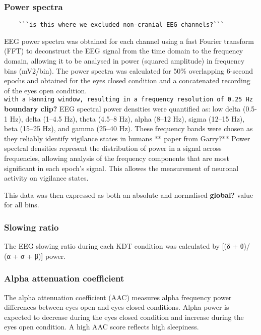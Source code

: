 \documentclass[
]{article}
\begin{document}
\subsubsection{Power spectra}\label{power-spectra}

\begin{verbatim}
    ```is this where we excluded non-cranial EEG channels?```
\end{verbatim}

EEG power spectra was obtained for each channel using a fast Fourier
transform (FFT) to deconstruct the EEG signal from the time domain to
the frequency domain, allowing it to be analysed in power (squared
amplitude) in frequency bins (mV2/bin). The power spectra was calculated
for 50\% overlapping 6-second epochs and obtained for the eyes closed
condition and a concatenated recording of the eyes open condition.
\texttt{with\ a\ Hanning\ window,\ resulting\ in\ a\ frequency\ resolution\ of\ 0.25\ Hz}
\textbf{boundary clip?} EEG spectral power densities were quantified as:
low delta (0.5-1 Hz), delta (1--4.5 Hz), theta (4.5--8 Hz), alpha (8--12
Hz), sigma (12--15 Hz), beta (15--25 Hz), and gamma (25--40 Hz). These
frequency bands were chosen as they reliably identify vigilance states
in humans ** paper from Garry?** Power spectral densities represent the
distribution of power in a signal across frequencies, allowing analysis
of the frequency components that are most significant in each epoch's
signal. This allowes the measurement of neuronal activity on vigilance
states.

This data was then expressed as both an absolute and normalised
\textbf{global?} value for all bins.

\subsubsection{Slowing ratio}\label{slowing-ratio}

The EEG slowing ratio during each KDT condition was calculated by {[}(δ
+ θ)/ (α + σ + β){]} power.

\subsubsection{Alpha attenuation
coefficient}\label{alpha-attenuation-coefficient}

The alpha attenuation coefficient (AAC) measures alpha frequency power
differences between eyes open and eyes closed conditions. Alpha power is
expected to decrease during the eyes closed condition and increase
during the eyes open condition. A high AAC score reflects high
sleepiness.
\end{document}
